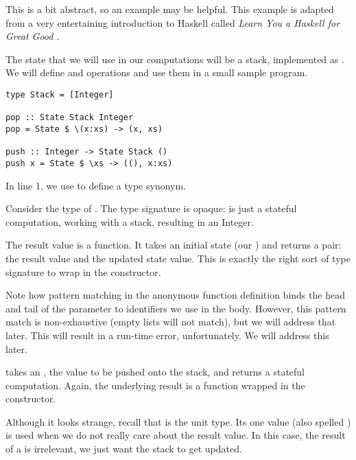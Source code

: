 This is a bit abstract, so an example may be helpful. This example is adapted from a very entertaining introduction
to Haskell called \emph{Learn You a Haskell for Great Good} \cite{learnyou}.

The state that we will use in our computations will be a stack, implemented as \code{[Integer]}. We will define
 and  operations and use them in a small sample program.

\begin{lstlisting}
type Stack = [Integer]

pop :: State Stack Integer
pop = State $ \(x:xs) -> (x, xs)

push :: Integer -> State Stack ()
push x = State $ \xs -> ((), x:xs)
\end{lstlisting}

\begin{notelist}
    \item In line 1, we use  to define a type synonym.
    \item Consider the type of . The type signature is opaque:  is just a stateful computation, working
          with a stack, resulting in an Integer.
    \item The result value is a function. It takes an initial state (our ) and returns a pair: the
          result value and the updated state value. This is exactly the right sort of type signature to wrap
          in the  constructor.
    \item Note how pattern matching in the anonymous function definition binds the head and tail of the  parameter
          to identifiers we use in the body. However, this pattern match is non-exhaustive (empty lists will not match),
          but we will address that later. This will result in a run-time error, unfortunately. We will address this later.
    \item {} takes an , the value to be pushed onto the stack, and returns a stateful computation.
          Again, the underlying result is a function wrapped in the  constructor.
    \item Although it looks strange, recall that \code{()} is the unit type. Its one value (also spelled \code{()}) is used when
          we do not really care about the result value. In this case, the result of a  is irrelevant, we just want
          the stack to get updated.
\end{notelist}

